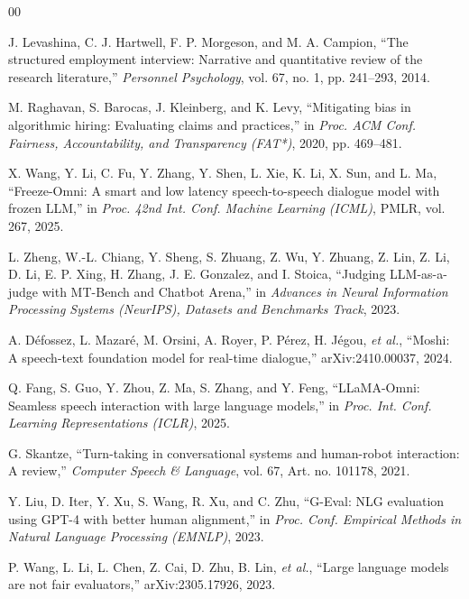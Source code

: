 \documentclass[conference]{IEEEtran}
\begin{document}
\begin{thebibliography}{00}

 J. Levashina, C. J. Hartwell, F. P. Morgeson, and M. A. Campion, ``The structured employment interview: Narrative and quantitative review of the research literature,'' \textit{Personnel Psychology}, vol. 67, no. 1, pp. 241--293, 2014.

 M. Raghavan, S. Barocas, J. Kleinberg, and K. Levy, ``Mitigating bias in algorithmic hiring: Evaluating claims and practices,'' in \textit{Proc. ACM Conf. Fairness, Accountability, and Transparency (FAT*)}, 2020, pp. 469--481.

 X. Wang, Y. Li, C. Fu, Y. Zhang, Y. Shen, L. Xie, K. Li, X. Sun, and L. Ma, ``Freeze-Omni: A smart and low latency speech-to-speech dialogue model with frozen LLM,'' in \textit{Proc. 42nd Int. Conf. Machine Learning (ICML)}, PMLR, vol. 267, 2025.

 L. Zheng, W.-L. Chiang, Y. Sheng, S. Zhuang, Z. Wu, Y. Zhuang, Z. Lin, Z. Li, D. Li, E. P. Xing, H. Zhang, J. E. Gonzalez, and I. Stoica, ``Judging LLM-as-a-judge with MT-Bench and Chatbot Arena,'' in \textit{Advances in Neural Information Processing Systems (NeurIPS), Datasets and Benchmarks Track}, 2023.

 A. D\'efossez, L. Mazar\'e, M. Orsini, A. Royer, P. P\'erez, H. J\'egou, \textit{et al.}, ``Moshi: A speech-text foundation model for real-time dialogue,'' arXiv:2410.00037, 2024.

 Q. Fang, S. Guo, Y. Zhou, Z. Ma, S. Zhang, and Y. Feng, ``LLaMA-Omni: Seamless speech interaction with large language models,'' in \textit{Proc. Int. Conf. Learning Representations (ICLR)}, 2025.

 G. Skantze, ``Turn-taking in conversational systems and human-robot interaction: A review,'' \textit{Computer Speech \& Language}, vol. 67, Art. no. 101178, 2021.

 Y. Liu, D. Iter, Y. Xu, S. Wang, R. Xu, and C. Zhu, ``G-Eval: NLG evaluation using GPT-4 with better human alignment,'' in \textit{Proc. Conf. Empirical Methods in Natural Language Processing (EMNLP)}, 2023.

 P. Wang, L. Li, L. Chen, Z. Cai, D. Zhu, B. Lin, \textit{et al.}, ``Large language models are not fair evaluators,'' arXiv:2305.17926, 2023.


\end{thebibliography}
\end{document}
